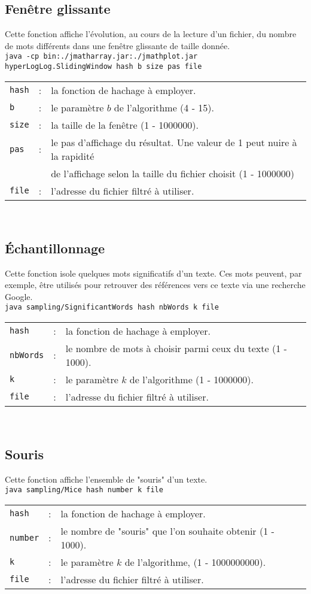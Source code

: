 \documentclass[12pt,a4paper,titlepage]{article}
\newcommand{\code}[1]{ \texttt{\footnotesize #1} }
\begin{document}
\subsection{Fenêtre glissante}
Cette fonction affiche l'évolution, au cours de la lecture d'un fichier, du nombre de mots différents dans une fenêtre glissante de taille donnée. \\
\code{java -cp bin:./jmatharray.jar:./jmathplot.jar hyperLogLog.SlidingWindow hash b size pas file}\\
\begin{tabular}{lcl}
\code{hash} &:& la fonction de hachage à employer.\\
\code{b} &:& le paramètre $b$ de l'algorithme (4 - 15).\\
\code{size} &:& la taille de la fenêtre (1 - 1000000).\\
\code{pas}&:& le pas d'affichage du résultat. Une valeur de 1 peut nuire à la rapidité\\
&& de l'affichage selon la taille du fichier choisit (1 - 1000000)\\
\code{file} &:& l'adresse du fichier filtré à utiliser.
\end{tabular}\\


\newpage
\subsection{Échantillonnage}
Cette fonction isole quelques mots significatifs d'un texte. Ces mots peuvent, par exemple, être utilisés pour retrouver des références vers ce texte via une recherche Google. \\
\code{java  sampling/SignificantWords hash nbWords k file}\\
\begin{tabular}{lcl}
\code{hash} &:& la fonction de hachage à employer.\\
\code{nbWords} &:& le nombre de mots à choisir parmi ceux du texte (1 - 1000).\\
\code{k} &:& le paramètre $k$ de l'algorithme (1 - 1000000).\\
\code{file} &:& l'adresse du fichier filtré à utiliser.
\end{tabular}\\


\subsection{Souris}
Cette fonction affiche l'ensemble de "souris" d'un texte.\\
\code{java  sampling/Mice hash number k file}\\
\begin{tabular}{lcl}
\code{hash} &:& la fonction de hachage à employer.\\
\code{number} &:& le nombre de "souris" que l'on souhaite obtenir (1 - 1000).\\
\code{k} &:& le paramètre $k$ de l'algorithme, (1 - 1000000000).\\
\code{file} &:& l'adresse du fichier filtré à utiliser.
\end{tabular}\\
\end{document}
